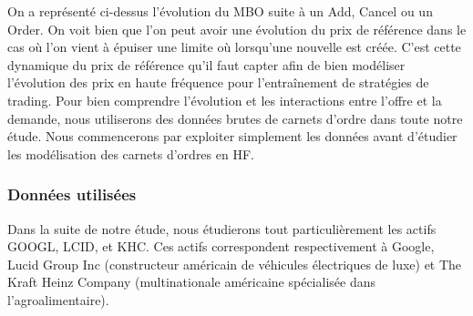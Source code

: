 \documentclass[12pt,a4paper]{article}
\theoremstyle{definition}
\theoremstyle{remark}
\begin{document}
On a représenté ci-dessus l'évolution du MBO suite à un Add, Cancel ou un Order. On voit bien que l'on peut avoir une évolution du prix de référence dans le cas où l'on vient à épuiser une limite où lorsqu'une nouvelle est créée. C'est cette dynamique du prix de référence qu'il faut capter afin de bien modéliser l'évolution des prix en haute fréquence pour l'entraînement de stratégies de trading. Pour bien comprendre l'évolution et les interactions entre l'offre et la demande, nous utiliserons des données brutes de carnets d'ordre dans toute notre étude. Nous commencerons par exploiter simplement les données avant d'étudier les modélisation des carnets d'ordres en HF.


\subsubsection{Données utilisées}
Dans la suite de notre étude, nous étudierons tout particulièrement les actifs GOOGL, LCID, et KHC. Ces actifs correspondent respectivement à Google, Lucid Group Inc (constructeur américain de véhicules électriques de luxe) et The Kraft Heinz Company (multinationale américaine spécialisée dans l'agroalimentaire).
\end{document}
